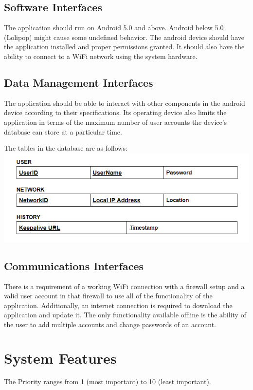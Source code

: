 \section{Software Interfaces}
The application should run on Android 5.0 and above. Android below 5.0 (Lolipop) might cause some undefined behavior. The android device should have the application installed and proper permissions granted. It should also have the ability to connect to a WiFi network using the system hardware. 

\section{Data Management Interfaces}
The application should be able to interact with other components in the android device according to their specifications. Its operating device also limits the application in terms of the maximum number of user accounts the device's database can store at a particular time.

The tables in the database are as follows:\\
\includegraphics[scale=0.7]{images/table.png}

\section{Communications Interfaces}
There is a requirement of a working WiFi connection with a firewall setup and a valid user account in that firewall to use all of the functionality of the application. Additionally, an internet connection is required to download the application and update it. The only functionality available offline is the ability of the user to add multiple accounts and change passwords of an account.

\chapter{System Features}
\label{System Features}
The Priority ranges from 1 (most important) to 10 (least important).


